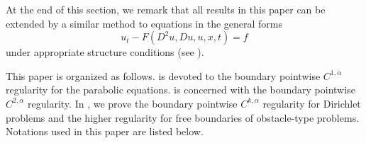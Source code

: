 \documentclass[preprint,12pt]{elsarticle}
\theoremstyle{definition}
\theoremstyle{remark}
\numberwithin{equation}{section}
\begin{document}
At the end of this section, we remark that all results in this paper can be extended by a similar method to equations in the general forms
\begin{equation*}
  u_t-F(D^2u, Du,u,x,t)=f
\end{equation*}
under appropriate structure conditions (see \cite{lian2020pointwise}).

This paper is organized as follows.  is devoted to the boundary pointwise $C^{1,\alpha}$ regularity for the parabolic equations.  is concerned with the boundary pointwise $C^{2,\alpha}$ regularity. In , we prove the boundary pointwise $C^{k,\alpha}$ regularity for Dirichlet problems and the higher regularity for free boundaries of obstacle-type problems. Notations used in this paper are listed below.
\end{document}

